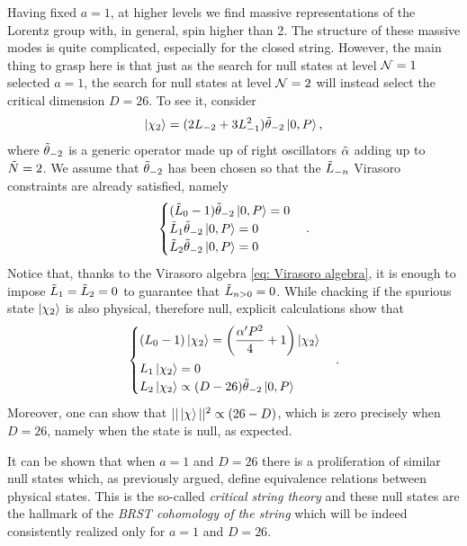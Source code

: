 Having fixed $a = 1$, at higher levels we find massive representations of the Lorentz group with, in general, spin higher than 2. The structure of these massive modes is quite complicated, especially for the closed string. However, the main thing to grasp here is that just as the search for null states at level $\mathcal{N} = 1$ selected $a = 1$, the search for null states at level $\mathcal{N} = 2$ will instead select the critical dimension $D = 26$. To see it, consider 
\begin{equation}
    \ket{\chi_2} = (2L_{-2} + 3L_{-1}^2)\tilde{\theta}_{-2}\ket{0,P},
\end{equation}
where $\tilde{\theta}_{-2}$ is a generic operator made up of right oscillators $\tilde{\alpha}$ adding up to $\tilde{N} = 2$. We assume that $\tilde{\theta}_{-2}$ has been chosen so that the $\tilde{L}_{-n}$ Virasoro constraints are already satisfied, namely
\begin{equation}
    \begin{cases}
        (\tilde{L}_0 - 1)\tilde{\theta}_{-2}\ket{0,P} = 0 \\
        \tilde{L}_1\tilde{\theta}_{-2}\ket{0,P} = 0 \\
        \tilde{L}_2\tilde{\theta}_{-2}\ket{0,P} = 0
    \end{cases}.
\end{equation}
Notice that, thanks to the Virasoro algebra \eqref{eq: Virasoro algebra}, it is enough to impose $\tilde{L}_1 = \tilde{L}_2 = 0$ to guarantee that $\tilde{L}_{n > 0} = 0$. While chacking if the spurious state $\ket{\chi_2}$ is also physical, therefore null, explicit calculations show that
\begin{equation}
    \begin{cases}
        (L_0 - 1)\ket{\chi_2} = \bigg(\dfrac{\alpha'P^2}{4} + 1\bigg)\ket{\chi_2} \\[2ex]
        L_1\ket{\chi_2} = 0 \\
        L_2\ket{\chi_2} \propto (D - 26)\tilde{\theta}_{-2}\ket{0,P}
    \end{cases}.
\end{equation}
Moreover, one can show that $||\ket{\chi}||^2 \propto (26 - D)$, which is zero precisely when $D = 26$, namely when the state is null, as expected.
\begin{obs}
    It can be shown that when $a = 1$ and $D = 26$ there is a proliferation of similar null states which, as previously argued, define equivalence relations between physical states. This is the so-called \emph{critical string theory} and these null states are the hallmark of the \emph{BRST cohomology of the string} which will be indeed consistently realized only for $a = 1$ and $D = 26$.
\end{obs}

